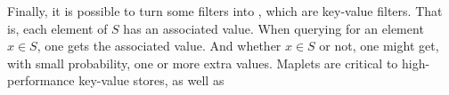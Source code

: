 Finally, it is possible to turn some filters into , which are key-value filters.  That is, each element of $S$ has an associated value.  When querying for an element $x\in S$, one gets the associated value.  And whether $x\in S$ or not, one might get, with small probability, one or more extra values.  Maplets are critical to high-performance key-value stores, as well as 









